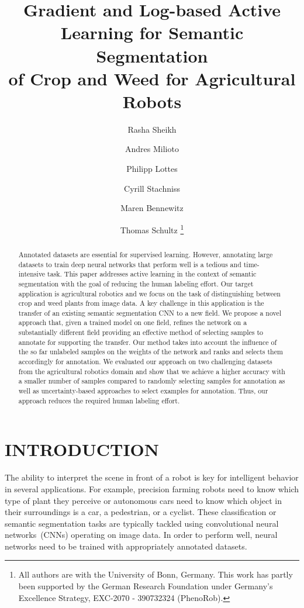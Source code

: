\documentclass[letterpaper, 10 pt, conference]{ieeeconf}  %
\title{\LARGE \bf Gradient and Log-based Active Learning for Semantic Segmentation \\of Crop and Weed for Agricultural Robots}
\author{Rasha Sheikh \and Andres Milioto \and Philipp Lottes \and Cyrill Stachniss \and Maren Bennewitz \and Thomas Schultz%
  \thanks{All authors are with the University of
    Bonn, Germany. This work has partly been supported by the German Research Foundation under Germany's Excellence Strategy, EXC-2070 - 390732324 (PhenoRob).}%
}
\begin{document}
\maketitle
\thispagestyle{empty} 
\pagestyle{empty}


\begin{abstract}
Annotated datasets are essential for supervised learning. However, annotating
large datasets to  train deep neural networks that perform well is a tedious
and time-intensive task. This paper  addresses active learning in the context
of semantic segmentation with the goal of reducing the  human labeling effort.
Our target application is agricultural robotics and we focus on the task of
distinguishing between crop and weed plants from image data. A key challenge in this
application is the  transfer of an existing semantic segmentation CNN to a new
field. We propose a novel approach that, given a trained model on one field,
refines the network on a substantially different field  providing an effective
method of selecting samples to annotate for supporting the transfer. Our
method takes into account the influence of the so far unlabeled samples on the
weights of the network and  ranks and selects them accordingly for annotation.
We evaluated our approach on two challenging  datasets from the agricultural
robotics domain and show that we achieve a higher accuracy with a  smaller
number of samples compared to randomly selecting samples for annotation as well as
uncertainty-based  approaches to select examples for annotation. Thus, our
approach reduces the required human labeling  effort.

\end{abstract} 

\section{INTRODUCTION}
\label{sec:intro}

The ability to  interpret the scene in front of a robot is key for
intelligent behavior in several applications. For example, precision farming
robots need to know which type of plant they perceive or autonomous cars need to
know  which object in their surroundings is a car, a pedestrian, or a
cyclist. These  classification or semantic segmentation tasks are typically
tackled using  convolutional neural networks~(CNNs) operating on  image data.
In order to perform  well, neural networks need to be trained with
appropriately annotated datasets.
\end{document}
